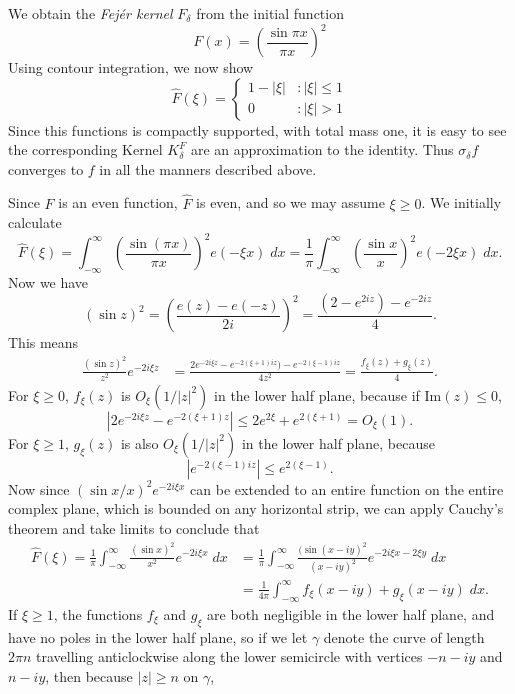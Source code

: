 \begin{example}
    We obtain the {\it Fej\'{e}r kernel} $F_\delta$ from the initial function
    \[ F(x) = \left( \frac{\sin \pi x}{\pi x} \right)^2 \]
    Using contour integration, we now show
    \[ \widehat{F}(\xi) = \begin{cases} 1 - |\xi| & : |\xi| \leq 1\\ 0 &: |\xi| > 1 \end{cases} \]
    Since this functions is compactly supported, with total mass one, it is easy to see the corresponding Kernel $K^F_\delta$ are an approximation to the identity. Thus $\sigma_\delta f$ converges to $f$ in all the manners described above.

    Since $F$ is an even function, $\widehat{F}$ is even, and so we may assume $\xi \geq 0$. We initially calculate
    \[ \widehat{F}(\xi) = \int_{-\infty}^\infty \left( \frac{\sin(\pi x)}{\pi x} \right)^2 e(- \xi x)\; dx = \frac{1}{\pi} \int_{-\infty}^\infty \left( \frac{\sin x}{x} \right)^2 e(- 2 \xi x) \; dx. \]
    Now we have
    \[ (\sin z)^2 = \left( \frac{e(z) - e(-z)}{2i} \right)^2 = \frac{(2 - e^{2iz}) - e^{-2iz}}{4}. \]
    This means
    \begin{align*}
        \frac{(\sin z)^2}{z^2} e^{- 2 i \xi z} &= \frac{2e^{-2 i \xi z} - e^{-2(\xi + 1) i z}) - e^{-2(\xi - 1)iz}}{4z^2 } = \frac{f_\xi(z) + g_\xi(z)}{4}.
    \end{align*}
    For $\xi \geq 0$, $f_\xi(z)$ is $O_\xi(1/|z|^2)$ in the lower half plane, because if $\text{Im}(z) \leq 0$,
    \[ |2e^{-2 i \xi z} - e^{-2(\xi + 1) z}| \leq 2e^{2\xi} + e^{2(\xi + 1)} = O_\xi(1). \]
    For $\xi \geq 1$, $g_\xi(z)$ is also $O_\xi(1/|z|^2)$ in the lower half plane, because
    \[ |e^{-2(\xi - 1)iz}| \leq e^{2(\xi - 1)}.  \]
    Now since $(\sin x/x)^2 e^{-2 i \xi x}$ can be extended to an entire function on the entire complex plane, which is bounded on any horizontal strip, we can apply Cauchy's theorem and take limits to conclude that
    \begin{align*}
        \widehat{F}(\xi) = \frac{1}{\pi} \int_{-\infty}^\infty \frac{(\sin x)^2}{x^2} e^{-2 i \xi x}\; dx &= \frac{1}{\pi} \int_{-\infty}^{\infty} \frac{(\sin (x - iy)^2}{(x - iy)^2} e^{-2 i \xi x  -2 \xi y}\; dx\\
        &= \frac{1}{4 \pi} \int_{-\infty}^\infty f_\xi(x - iy) + g_\xi(x - iy)\; dx.
    \end{align*}
    If $\xi \geq 1$, the functions $f_\xi$ and $g_\xi$ are both negligible in the lower half plane, and have no poles in the lower half plane, so if we let $\gamma$ denote the curve of length $2 \pi n$ travelling anticlockwise along the lower semicircle with vertices $-n - iy$ and $n - iy$, then because $|z| \geq n$ on $\gamma$,

\end{example}
